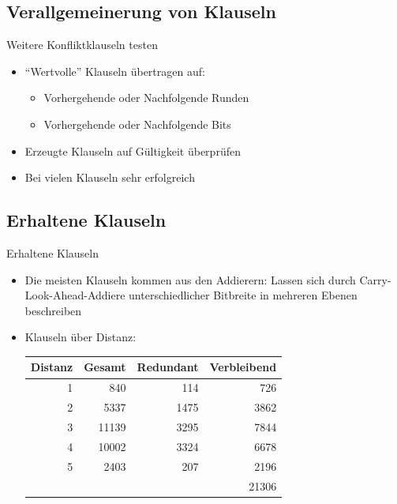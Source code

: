 \documentclass{beamer}
\begin{document}
  \subsection{Verallgemeinerung von Klauseln}
    \begin{frame}{Weitere Konfliktklauseln testen}
      \begin{itemize}
        \setlength{\itemsep}{20pt}
        \item "`Wertvolle"' Klauseln übertragen auf:
        \begin{itemize}
          \item Vorhergehende oder Nachfolgende Runden
          \item Vorhergehende oder Nachfolgende Bits
        \end{itemize}
        \item Erzeugte Klauseln auf Gültigkeit überprüfen
        \item Bei vielen Klauseln sehr erfolgreich
      \end{itemize}
    \end{frame}
  \subsection{Erhaltene Klauseln}
    \begin{frame}{Erhaltene Klauseln}
      \begin{itemize}
        \item Die meisten Klauseln kommen aus den Addierern: Lassen sich durch Carry-Look-Ahead-Addiere unterschiedlicher Bitbreite in mehreren Ebenen beschreiben
        \pause
        \item Klauseln über Distanz:\newline
        \begin{tabular}{rrrr}
          Distanz & Gesamt & Redundant & Verbleibend\\
          \hline
                1 &    840 &       114 &   726\\
                2 &   5337 &      1475 &  3862\\
                3 &  11139 &      3295 &  7844\\
                4 &  10002 &      3324 &  6678\\
                5 &   2403 &       207 &  2196\\
          \hline
                  &        &           & 21306
        \end{tabular}
      \end{itemize}
    \end{frame}
\end{document}
